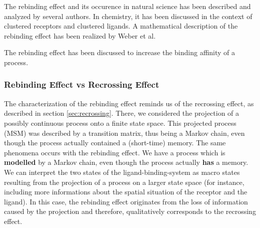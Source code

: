 The rebinding effect and its occurence in natural science has been described and analyzed by several authors\cite{goldstein1995approximating, vauquelin2010}.
In chemistry, it has been discussed in the context of clustered receptors and clustered ligands\cite{care2011impact}. %
A mathematical description of the rebinding effect has been realized by Weber et al\cite{weber2012,weber2014}.

The rebinding effect has been discussed to increase the binding affinity of a process.


\subsubsection*{Rebinding Effect vs Recrossing Effect}
The characterization of the rebinding effect reminds us of  the recrossing effect, as described in section \ref{sec:recrossing}.
There, we considered the projection of a possibly continuous process onto a finite state space. This projected process (MSM) was described by a transition matrix, thus being a Markov chain, even though the process actually contained a (short-time) memory. 
The same phenomena occurs with the rebinding effect.
We have a process which is \textbf{modelled} by a Markov chain, even though the process actually \textbf{has} a memory.
We can interpret the two states of the ligand-binding-system as macro states resulting from the projection of a process on a larger state space (for instance, including more informations about the spatial situation of the receptor and the ligand).
In this case, the rebinding effect originates from the loss of information caused by the projection and therefore, qualitatively corresponds to the recrossing effect. %
\\

